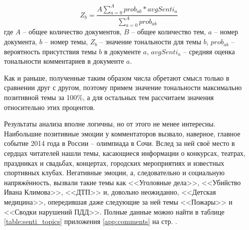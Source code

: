 \begin{equation}\label{eq:senti_topics}
Z_b = \frac{A \sum \limits_{a=0}^{A}prob_{ab} * avgSenti_a}{\sum_{a=0}^{A} prob_{ab}}
\end{equation}
где $A$ -- общее количество документов, $B$ -- общее количество тем, $a$ -- номер документа, $b$ -- номер темы, $Z_b$ -- значение тональности для темы $b$, $prob_{ab}$ -- вероятность присутствия темы $b$ в документе $a$, $avgSenti_a$ -- средняя оценка тональности комментариев в документе $a$.

Как и раньше, полученные таким образом числа обретают смысл только в сравнении друг с другом, поэтому примем значение тональности максимально позитивной темы за 100\%, а для остальных тем рассчитаем значения относительно этих процентов.

Результаты анализа вполне логичны, но от этого не менее интересны. Наибольшие позитивные эмоции у комментаторов вызвало, наверное, главное событие 2014 года в России -- олимпиада в Сочи. Вслед за ней своё место в сердцах читателей нашли темы, касающиеся информации о конкурсах, театрах, праздниках и свадьбах, концертах, городских мероприятиях и известных спортивных клубах. Негативные эмоции, а, следовательно и социальную напряжённость, вызвали такие темы как <<Уголовные дела>>, <<Убийство Ивана Климова>>, <<ДТП>> и, довольно неожиданно, <<Детская медицина>>, опередившая даже следующие за ней темы <<Пожары>> и <<Сводки нарушений ПДД>>. Полные данные можно найти в таблице \ref{table:senti_topics} приложения \ref{app:comments} на стр. \pageref{table:senti_topics}.

